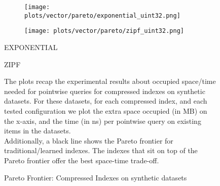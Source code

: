 \documentclass{article}
\begin{document}
\begin{figure}[!htbp]
{\begin{minipage}[t][0.98\textheight][t]{\textwidth}
    \begin{minipage}{0.48\linewidth}
        \begin{figure}[H]
        \texttt{[image: plots/vector/pareto/exponential\_uint32.png]}
        \end{figure}
    \end{minipage}
    \begin{minipage}{0.48\linewidth}
        \begin{figure}[H]
        \texttt{[image: plots/vector/pareto/zipf\_uint32.png]}
        \end{figure}
    \end{minipage}
    \begin{minipage}{0.48\linewidth}
    \begin{center}
        EXPONENTIAL
    \end{center}
    \end{minipage}
    \begin{minipage}{0.48\linewidth}
    \begin{center}
        ZIPF
    \end{center}
    \end{minipage}

    \vfill
    
    \begin{minipage}{\linewidth}
        The plots recap the experimental results about occupied space/time needed for pointwise queries for compressed indexes on synthetic datasets. For these datasets, for each compressed index, and each tested configuration we plot the extra space occupied (in MB) on the x-axis, and the time (in ns) per pointwise query on existing items in the datasets. \\

    Additionally, a black line shows the Pareto frontier for traditional/learned indexes. The indexes that sit on top of the Pareto frontier offer the best space-time trade-off. 
            \end{minipage}
    \vspace{10px}
\end{minipage}
}
\caption{Pareto Frontier: Compressed Indexes on synthetic datasets}
\end{figure}
\end{document}
